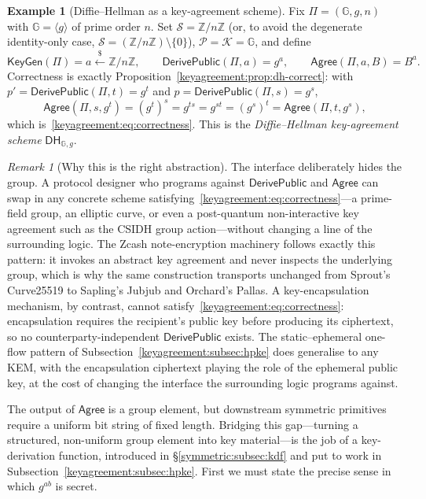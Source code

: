 \documentclass[11pt,a4paper]{article}
\theoremstyle{definition}
\newtheorem{example}[theorem]{Example}
\theoremstyle{remark}
\newtheorem{remark}[theorem]{Remark}
\newcommand{\Z}{\ensuremath{\mathbb{Z}}}
\newcommand{\G}{\ensuremath{\mathbb{G}}}
\begin{document}
\begin{example}[Diffie--Hellman as a key-agreement scheme]\label{keyagreement:exp:dh-scheme}
Fix \(\Pi = (\G, g, n)\) with \(\G = \langle g\rangle\) of prime order \(n\). Set \(\mathcal{S} = \Z/n\Z\) (or, to avoid the degenerate identity-only case, \(\mathcal{S} = (\Z/n\Z)\setminus\{0\}\)), \(\mathcal{P} = \mathcal{K} = \G\), and define
\[
  \mathsf{KeyGen}(\Pi) = a \xleftarrow{\$} \Z/n\Z, \qquad
  \mathsf{DerivePublic}(\Pi, a) = g^a, \qquad
  \mathsf{Agree}(\Pi, a, B) = B^a.
\]
Correctness is exactly Proposition~\ref{keyagreement:prop:dh-correct}: with \(p' = \mathsf{DerivePublic}(\Pi, t) = g^t\) and \(p = \mathsf{DerivePublic}(\Pi, s) = g^s\),
\[
  \mathsf{Agree}(\Pi, s, g^t) = (g^t)^s = g^{ts} = g^{st} = (g^s)^t = \mathsf{Agree}(\Pi, t, g^s),
\]
which is~\eqref{keyagreement:eq:correctness}. This is the \emph{Diffie--Hellman key-agreement scheme} \(\mathsf{DH}_{\G,g}\).
\end{example}

\begin{remark}[Why this is the right abstraction]\label{keyagreement:rem:abstraction}
The interface deliberately hides the group. A protocol designer who programs against \(\mathsf{DerivePublic}\) and \(\mathsf{Agree}\) can swap in any concrete scheme satisfying~\eqref{keyagreement:eq:correctness}---a prime-field group, an elliptic curve, or even a post-quantum non-interactive key agreement such as the CSIDH group action---without changing a line of the surrounding logic. The Zcash note-encryption machinery follows exactly this pattern: it invokes an abstract key agreement and never inspects the underlying group, which is why the same construction transports unchanged from Sprout's Curve25519 to Sapling's Jubjub and Orchard's Pallas. A key-encapsulation mechanism, by contrast, cannot satisfy~\eqref{keyagreement:eq:correctness}: encapsulation requires the recipient's public key before producing its ciphertext, so no counterparty-independent \(\mathsf{DerivePublic}\) exists. The static--ephemeral one-flow pattern of Subsection~\ref{keyagreement:subsec:hpke} does generalise to any KEM, with the encapsulation ciphertext playing the role of the ephemeral public key, at the cost of changing the interface the surrounding logic programs against.
\end{remark}

The output of \(\mathsf{Agree}\) is a group element, but downstream symmetric primitives require a uniform bit string of fixed length. Bridging this gap---turning a structured, non-uniform group element into key material---is the job of a key-derivation function, introduced in \S\ref{symmetric:subsec:kdf} and put to work in Subsection~\ref{keyagreement:subsec:hpke}. First we must state the precise sense in which \(g^{ab}\) is secret.
\end{document}
